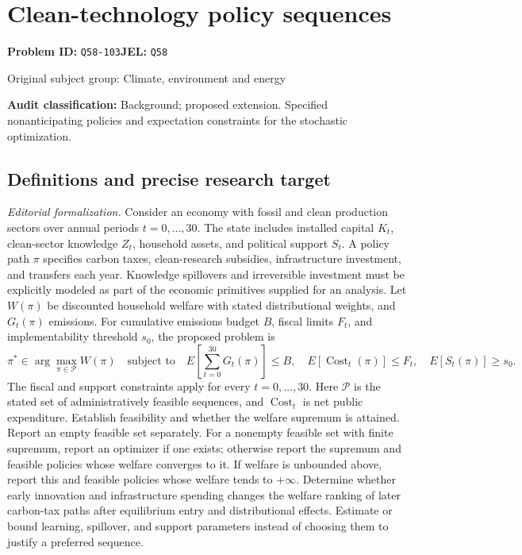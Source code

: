 \documentclass[11pt,a4paper]{article}
\begin{document}
\section*{Clean-technology policy sequences}
\textbf{Problem ID:} \texttt{Q58-103}\quad \textbf{JEL:} \texttt{Q58}\par
\label{problem:OP-0439}
{\sffamily\small\color{muted}Original subject group: Climate, environment and energy\par}
\label{definitions:problem:30007721}
\textbf{Audit classification:} Background; proposed extension. Specified nonanticipating policies and expectation constraints for the stochastic optimization.
\subsection*{Definitions and precise research target}
\textit{Editorial formalization.} Consider an economy with fossil and clean production sectors over annual periods \(t=0,\ldots,30\). The state includes installed capital \(K_t\), clean-sector knowledge \(Z_t\), household assets, and political support \(S_t\). A policy path \(\pi\) specifies carbon taxes, clean-research subsidies, infrastructure investment, and transfers each year. Knowledge spillovers and irreversible investment must be explicitly modeled as part of the economic primitives supplied for an analysis. Let \(W(\pi)\) be discounted household welfare with stated distributional weights, and \(G_t(\pi)\) emissions. For cumulative emissions budget \(B\), fiscal limits \(F_t\), and implementability threshold \(s_0\), the proposed problem is
\[\pi^*\in\arg\max_{\pi\in\mathcal P}W(\pi)\quad\text{subject to}\quad E[\sum_{t=0}^{30}G_t(\pi)]\leq B,\quad E[\operatorname{Cost}_t(\pi)]\leq F_t,\quad E[S_t(\pi)]\geq s_0.\]
The fiscal and support constraints apply for every \(t=0,\ldots,30\). Here \(\mathcal P\) is the stated set of administratively feasible sequences, and \(\operatorname{Cost}_t\) is net public expenditure. Establish feasibility and whether the welfare supremum is attained. Report an empty feasible set separately. For a nonempty feasible set with finite supremum, report an optimizer if one exists; otherwise report the supremum and feasible policies whose welfare converges to it. If welfare is unbounded above, report this and feasible policies whose welfare tends to \(+\infty\). Determine whether early innovation and infrastructure spending changes the welfare ranking of later carbon-tax paths after equilibrium entry and distributional effects. Estimate or bound learning, spillover, and support parameters instead of choosing them to justify a preferred sequence.
\end{document}
